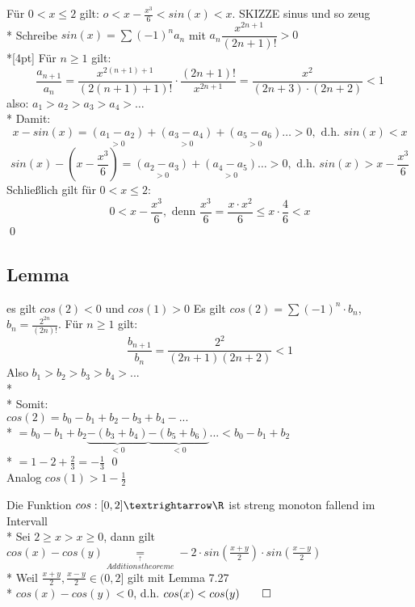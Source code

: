 

Für $0<x\leq 2$ gilt: $o<x-\frac{x^3}{6}<sin(x)<x$. SKIZZE sinus und so zeug\\*
\bew
Schreibe $sin(x)=\sum(-1)^na_n$ mit $a_n\dfrac{x^{2n+1}}{(2n+1)!}>0$\\*[4pt]
Für $n\geq 1$ gilt: $$\frac{a_{n+1}}{a_n}=\dfrac{x^{2(n+1)+1}}{(2(n+1)+1)!}·\dfrac{(2n+1)!}{x^{2n+1}}=\frac{x^2}{(2n+3)·(2n+2)}<1$$
also: $a_1>a_2>a_3>a_4>…$\\*
Damit: $$x-sin(x)=\underset{>0}{(a_1-a_2)}+\underset{>0}{(a_3-a_4)}+\underset{>0}{(a_5-a_6)}…>0,\text{ d.h. $sin(x)<x$}$$
$$sin(x)-(x-\frac{x^3}{6})=\underset{>0}{(a_2-a_3)}+\underset{>0}{(a_4-a_5)}…>0,\text{ d.h. $sin(x)>x-\frac{x^3}{6}$}$$
Schließlich gilt für $0<x\leq 2$:
$$0<x-\frac{x^3}{6}, \text{ denn } \frac{x^3}{6}=\frac{x·x^2}{6}\leq x·\frac{4}{6}<x$$ \qed

\subsection*{Lemma} es gilt $cos(2) < 0$ und $cos(1) > 0$
\bew
	Es gilt $cos(2) = \sum (-1)^n \cdot b_n$, $b_n = \frac{2^{2n}}{(2n)!}$. Für $n \geq 1$ gilt: 
	$$\frac{b_{n+1}}{b_n} = \frac{2^2}{(2n+1)(2n+2)} < 1$$
	Also $b_1 > b_2 > b_3 > b_4 >...$ \\*
	\\*
	Somit:\\
	$cos(2) = b_0 - b_1 + b_2 - b_3 + b_4 - ...$\\*
	$= b_0 - b_1 + b_2 \underbrace{-(b_3 + b_4)}_{<0} \underbrace{-(b_5 + b_6)}_{< 0}... < b_0 - b_1 + b_2$ \\*
	$= 1 - 2 + \frac{2}{3} = - \frac{1}{3}$ \qed\\
	Analog $cos(1) > 1-\frac{1}{2}$

Die Funktion $cos:[0,2]→\R$ ist streng monoton fallend im Intervall\\*
\bew
Sei $2\geq x>x\geq 0$, dann gilt $cos(x)-cos(y)\underset{\overset{\uparrow}{Additionstheoreme}}{=}-2·sin(\frac{x+y}{2})·sin(\frac{x-y}{2})$\\*
Weil $\frac{x+y}{2}, \frac{x-y}{2}\in (0,2]$ gilt mit Lemma 7.27\\*
$cos(x)-cos(y)<0$, d.h. $cos(x)<cos(y)\qed$

